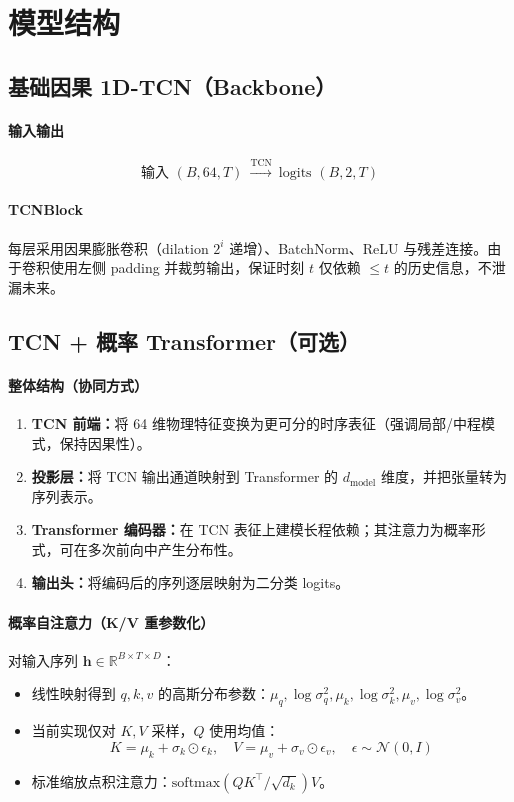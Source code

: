 \documentclass[UTF8,a4paper,11pt]{ctexart}
\begin{document}
\section{模型结构}

\subsection{基础因果 1D-TCN（Backbone）}
\paragraph{输入输出}
\[
\text{输入 }(B,64,T)\ \xrightarrow{\text{TCN}}\ \text{logits }(B,2,T)
\]

\paragraph{TCNBlock}
每层采用因果膨胀卷积（dilation \(2^i\) 递增）、BatchNorm、ReLU 与残差连接。由于卷积使用左侧 padding 并裁剪输出，保证时刻 \(t\) 仅依赖 \(\le t\) 的历史信息，不泄漏未来。

\subsection{TCN + 概率 Transformer（可选）}

\paragraph{整体结构（协同方式）}
\begin{enumerate}
  \item \textbf{TCN 前端：}将 64 维物理特征变换为更可分的时序表征（强调局部/中程模式，保持因果性）。
  \item \textbf{投影层：}将 TCN 输出通道映射到 Transformer 的 \(d_{\text{model}}\) 维度，并把张量转为序列表示。
  \item \textbf{Transformer 编码器：}在 TCN 表征上建模长程依赖；其注意力为概率形式，可在多次前向中产生分布性。
  \item \textbf{输出头：}将编码后的序列逐层映射为二分类 logits。
\end{enumerate}

\paragraph{概率自注意力（K/V 重参数化）}
对输入序列 \(\mathbf{h}\in\mathbb{R}^{B\times T\times D}\)：
\begin{itemize}
  \item 线性映射得到 \(q,k,v\) 的高斯分布参数：\(\mu_q,\log\sigma_q^2,\mu_k,\log\sigma_k^2,\mu_v,\log\sigma_v^2\)。
  \item 当前实现仅对 \(K,V\) 采样，\(Q\) 使用均值：\[
    K=\mu_k+\sigma_k\odot\epsilon_k,\quad V=\mu_v+\sigma_v\odot\epsilon_v,\quad \epsilon\sim\mathcal{N}(0,I)
  \]
  \item 标准缩放点积注意力：\(\mathrm{softmax}(QK^\top/\sqrt{d_k})V\)。
\end{itemize}
\end{document}
